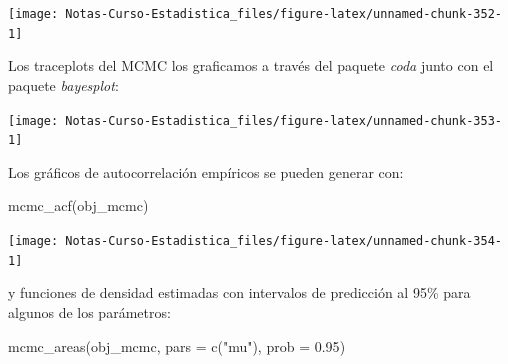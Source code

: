\documentclass[
  12pt,
]{book}
\newenvironment{Shaded}{\begin{snugshade}}{\end{snugshade}}
\newcommand{\AttributeTok}[1]{\textcolor[rgb]{0.77,0.63,0.00}{#1}}
\newcommand{\DecValTok}[1]{\textcolor[rgb]{0.00,0.00,0.81}{#1}}
\newcommand{\FloatTok}[1]{\textcolor[rgb]{0.00,0.00,0.81}{#1}}
\newcommand{\FunctionTok}[1]{\textcolor[rgb]{0.00,0.00,0.00}{#1}}
\newcommand{\NormalTok}[1]{#1}
\newcommand{\OtherTok}[1]{\textcolor[rgb]{0.56,0.35,0.01}{#1}}
\newcommand{\SpecialCharTok}[1]{\textcolor[rgb]{0.00,0.00,0.00}{#1}}
\newcommand{\StringTok}[1]{\textcolor[rgb]{0.31,0.60,0.02}{#1}}
\theoremstyle{definition}
\theoremstyle{definition}
\theoremstyle{definition}
\theoremstyle{definition}
\theoremstyle{remark}
\begin{document}
\begin{center}\texttt{[image: Notas-Curso-Estadistica\_files/figure-latex/unnamed-chunk-352-1]} \end{center}

Los traceplots del MCMC los graficamos a través del paquete \emph{coda} junto con el paquete \emph{bayesplot}:

\begin{Shaded}
\end{Shaded}

\begin{center}\texttt{[image: Notas-Curso-Estadistica\_files/figure-latex/unnamed-chunk-353-1]} \end{center}

Los gráficos de autocorrelación empíricos se pueden generar con:

\begin{Shaded}
\begin{Highlighting}[]
\FunctionTok{mcmc\_acf}\NormalTok{(obj\_mcmc)}
\end{Highlighting}
\end{Shaded}

\begin{center}\texttt{[image: Notas-Curso-Estadistica\_files/figure-latex/unnamed-chunk-354-1]} \end{center}

y funciones de densidad estimadas con intervalos de predicción al 95\% para algunos de los parámetros:

\begin{Shaded}
\begin{Highlighting}[]
\FunctionTok{mcmc\_areas}\NormalTok{(obj\_mcmc, }\AttributeTok{pars =} \FunctionTok{c}\NormalTok{(}\StringTok{"mu"}\NormalTok{), }\AttributeTok{prob =} \FloatTok{0.95}\NormalTok{)}
\end{Highlighting}
\end{Shaded}
\end{document}
